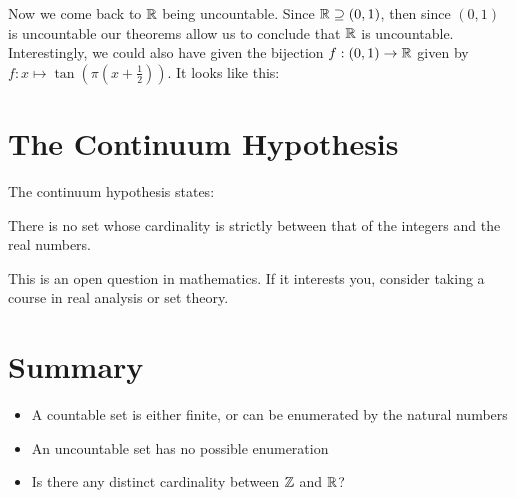 \documentclass[main.tex]{subfiles}
\begin{document}
Now we come back to \(\mathbb{R}\) being uncountable. Since \(\mathbb{R} \supseteq (0,1)\), then since \((0,1)\) is uncountable our theorems allow us to conclude that \(\mathbb{R}\) is uncountable. Interestingly, we could also have given the bijection \(f : (0,1) \rightarrow \mathbb{R}\) given by \(f : x \mapsto \tan(\pi(x+\frac{1}{2}))\). It looks like this:

\begin{center}
\end{center}

\section{The Continuum Hypothesis}

The continuum hypothesis states:
\begin{center}
	There is no set whose cardinality is strictly between that of the integers and the real numbers.
\end{center}
This is an open question in mathematics.
If it interests you, consider taking a course in real analysis or set theory.

\section{Summary}

\begin{itemize}
	\item A countable set is either finite, or can be enumerated by the natural numbers
	\item An uncountable set has no possible enumeration
	\item Is there any distinct cardinality between \(\mathbb{Z}\) and \(\mathbb{R}\)?
\end{itemize}
\end{document}
